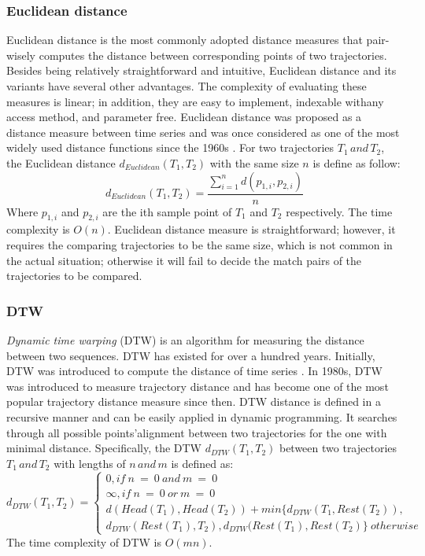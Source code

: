 \documentclass[a4paper, 12pt]{article}
\begin{document}
\subsubsection{Euclidean distance}
Euclidean distance is the most commonly adopted distance measures that pair-wisely computes the distance between corresponding points of two trajectories. Besides being relatively straightforward and intuitive, Euclidean distance and its variants have several other advantages. The complexity of evaluating these measures is linear; in addition, they are easy to implement, indexable withany access method, and parameter free. Euclidean distance was proposed as a distance measure between time series and was once considered as one of the most widely used distance functions since the 1960s \citep{keogh2000scaling,faloutsos1994fast,pfeifer1980three,priestley1980state}.
For two trajectories $T_{1}\,and\,T_{2}$, the Euclidean distance $d_{Euclidean}(T_{1}, T_{2})$ with the same size $n$ is define as follow:
\begin{equation} \label{eq1}
    d_{Euclidean}(T_{1}, T_{2}) = \frac{\sum_{i=1}^n d(p_{1,i}, p_{2,i})}{n}
\end{equation}
Where $p_{1,i}$ and $p_{2,i}$ are the ith sample point of $T_{1}$ and $T_{2}$ respectively. The time complexity is $O(n)$. Euclidean distance measure is straightforward; however, it requires the comparing trajectories to be the same size, which is not common in the actual situation; otherwise it will fail to decide the match pairs of the trajectories to be compared.

\subsubsection{DTW}
\textit{Dynamic time warping} (DTW) is an algorithm for measuring the distance between two sequences. DTW has existed for over a hundred years. Initially, DTW was introduced to compute the distance of time series \citep{myers1980performance}. In 1980s, DTW was introduced to measure trajectory distance \citep{kruskal1983overview} and has become one of the most popular trajectory distance measure since then. DTW distance is defined in a recursive manner and can be easily applied in dynamic programming. It searches through all possible points’alignment between two trajectories for the one with minimal distance. Specifically, the DTW $d_{DTW} (T_{1},T_{2})$ between two trajectories $T_{1}\,and\,T_{2}$ with lengths of $n\,and\,m$ is defined as:
\begin{equation} \label{eq2}
    d_{DTW} (T_{1},T_{2}) = \begin{cases}
                                0, if\:n\:=\:0\:and\:m\:=\:0 \\
                                \infty, if\:n\:=\:0\:or\:m\:=\:0 \\
                                d(Head(T_{1}), Head(T_{2})) + min\{d_{DTW}(T_{1}, Rest(T_{2})), \\ d_{DTW}(Rest(T_{1}), T_{2}), d_{DTW}(Rest(T_{1}), Rest(T_{2}) \} \: otherwise
                            \end{cases}
\end{equation}
The time complexity of DTW is $O(mn)$.
\end{document}
